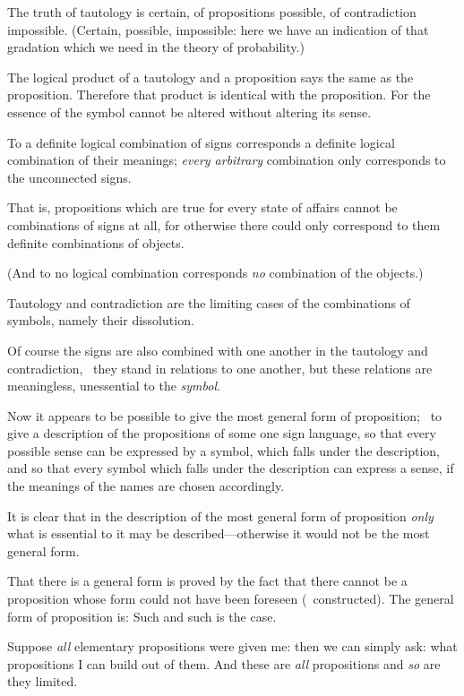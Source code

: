 {The truth of tautology is certain, of propositions
possible, of contradiction impossible. (Certain,
possible, impossible: here we have an indication
of that gradation which we need in the theory of
probability.)}


{The logical product of a tautology and a proposition
says the same as the proposition. Therefore
that product is identical with the proposition.
For the essence of the symbol cannot be altered
without altering its sense.}


{To a definite logical combination of signs
corresponds a definite logical combination of their
meanings; \emph{every arbitrary} combination only corresponds
to the unconnected signs.

That is, propositions which are true for every
state of affairs cannot be combinations of signs at
all, for otherwise there could only correspond to
them definite combinations of objects.

(And to no logical combination corresponds \emph{no}
combination of the objects.)

Tautology and contradiction are the limiting
cases of the combinations of symbols, namely their
dissolution.}


{Of course the signs are also combined with one
another in the tautology and contradiction, \idEst\ they
stand in relations to one another, but these
relations are meaningless, unessential to the
\emph{symbol}.}


{Now it appears to be possible to give the
most general form of proposition; \idEst\ to give a
description of the propositions of some one sign
language, so that every possible sense can be
expressed by a symbol, which falls under the
description, and so that every symbol which falls
under the description can express a sense, if
the meanings of the names are chosen accordingly.

It is clear that in the description of the most
general form of proposition \emph{only} what is essential
to it may be described---otherwise it would not be
the most general form.

That there is a general form is proved by the
fact that there cannot be a proposition whose
form could not have been foreseen (\idEst\ constructed).
The general form of proposition is: Such and
such is the case.}


{Suppose \emph{all} elementary propositions were given
me: then we can simply ask: what propositions I
can build out of them. And these are \emph{all} propositions
and \emph{so} are they limited.}



